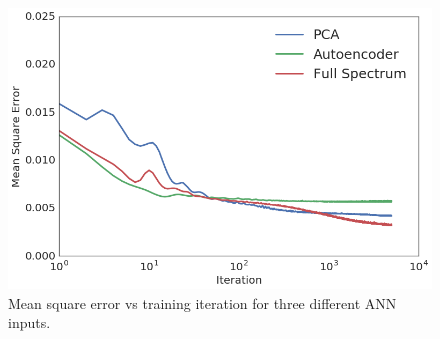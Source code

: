 \documentclass[tocnosub,noragright,centerchapter,12pt,fullpage]{uiucecethesis09}
\begin{document}


\begin{figure}[H]
    \centering
    \includegraphics[width=0.5\linewidth]{images/MSE_vs_iteration}
    \caption{Mean square error vs training iteration for three different ANN inputs.}
    \label{fig:enrichment_error}
\end{figure}

\end{document}
